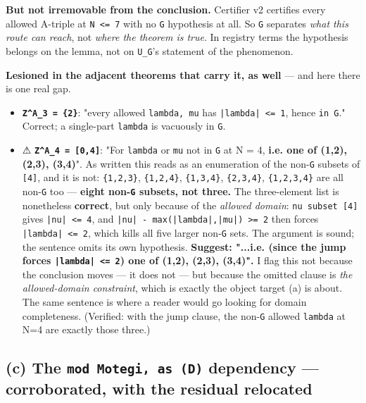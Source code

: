 \documentclass[11pt,a4paper]{article}
\begin{document}
\textbf{But not irremovable from the conclusion.} Certifier v2 certifies every allowed A-triple at \mbox{\texttt{N <= 7}} with no \mbox{\texttt{G}} hypothesis at all. So \mbox{\texttt{G}} separates \emph{what this route can reach}, not \emph{where the theorem is true}. In registry terms the hypothesis belongs on the lemma, not on \mbox{\texttt{U\_G}}'s statement of the phenomenon.

\textbf{Lesioned in the adjacent theorems that carry it, as well} --- and here there is one real gap.

\begin{itemize}
\item \textbf{\mbox{\texttt{Z\textasciicircum{}A\_3 = \{2\}}}}: "every allowed \mbox{\texttt{lambda, mu}} has \mbox{\texttt{|lambda| <= 1}}, hence \mbox{\texttt{in G}}." Correct; a single-part \mbox{\texttt{lambda}} is vacuously in \mbox{\texttt{G}}.
\item ⚠ \textbf{\mbox{\texttt{Z\textasciicircum{}A\_4 = [0,4]}}}: "For \mbox{\texttt{lambda}} or \mbox{\texttt{mu}} not in \mbox{\texttt{G}} at N = 4, \textbf{i.e. one of (1,2), (2,3), (3,4)}". As written this reads as an enumeration of the non-\mbox{\texttt{G}} subsets of \mbox{\texttt{[4]}}, and it is not: \mbox{\texttt{\{1,2,3\}}}, \mbox{\texttt{\{1,2,4\}}}, \mbox{\texttt{\{1,3,4\}}}, \mbox{\texttt{\{2,3,4\}}}, \mbox{\texttt{\{1,2,3,4\}}} are all non-\mbox{\texttt{G}} too --- \textbf{eight non-\mbox{\texttt{G}} subsets, not three.} The three-element list is nonetheless \textbf{correct}, but only because of the \emph{allowed domain}: \mbox{\texttt{nu subset [4]}} gives \mbox{\texttt{|nu| <= 4}}, and \mbox{\texttt{|nu| - max(|lambda|,|mu|) >= 2}} then forces \mbox{\texttt{|lambda| <= 2}}, which kills all five larger non-\mbox{\texttt{G}} sets. The argument is sound; the sentence omits its own hypothesis. \textbf{Suggest: "...i.e. (since the jump forces \mbox{\texttt{|lambda| <= 2}}) one of (1,2), (2,3), (3,4)".} I flag this not because the conclusion moves --- it does not --- but because the omitted clause is \emph{the allowed-domain constraint}, which is exactly the object target (a) is about. The same sentence is where a reader would go looking for domain completeness. (Verified: with the jump clause, the non-\mbox{\texttt{G}} allowed \mbox{\texttt{lambda}} at N=4 are exactly those three.)
\end{itemize}

\subsection*{(c) The \mbox{\texttt{mod Motegi, as (D)}} dependency --- corroborated, with the residual relocated}
\end{document}
